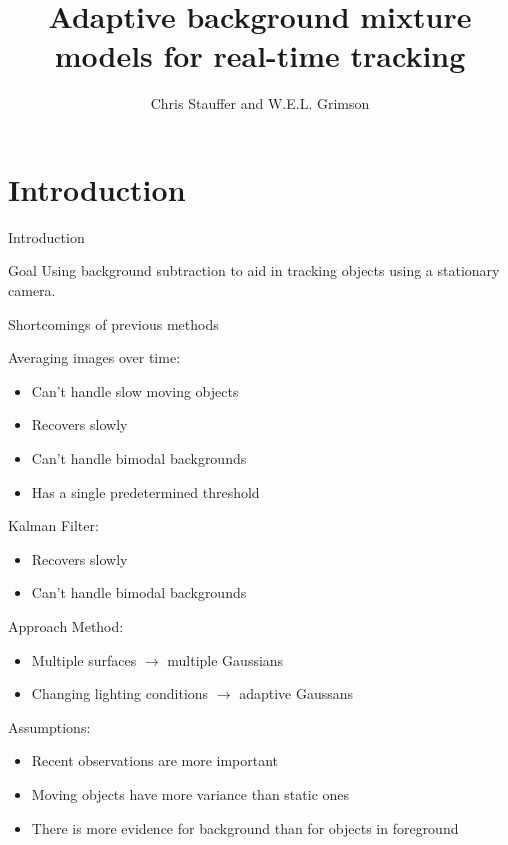 \documentclass{beamer}
\title[Adaptive background mixture models for real-time tracking]
{Adaptive background mixture models for real-time tracking}
\author[Chris Stauffer and W.E.L. Grimson] %
{Chris Stauffer and W.E.L. Grimson}
\institute[University of Amsterdam] %
{
  Chiel Kooijman and Auke Wiggers \\
  Computer Vision  \\
  Artificial Intelligence \\
  Faculty of Science (FNWI) \\
  University of Amsterdam
}
\begin{document}
\maketitle


\begin{comment}
\begin{frame}{Outline}
  \setcounter{tocdepth}{1}
  \tableofcontents
\end{frame}
\end{comment}

\section{Introduction}
\begin{frame}{Introduction}
\begin{block}{Goal}
Using background subtraction to aid in tracking objects using a stationary camera.
\end{block}

\end{frame}

\begin{frame}{Shortcomings of previous methods}

Averaging images over time:
\begin{itemize}
\item Can't handle slow moving objects
\item Recovers slowly
\item Can't handle bimodal backgrounds
\item Has a single predetermined threshold
\end{itemize}

Kalman Filter:
\begin{itemize}
\item Recovers slowly
\item Can't handle bimodal backgrounds
\end{itemize}
\end{frame}

\begin{frame}{Approach}
Method:
\begin{itemize}
\item Multiple surfaces $\rightarrow$ multiple Gaussians
\item Changing lighting conditions $\rightarrow$ adaptive Gaussans
\end{itemize}

Assumptions:
\begin{itemize}
\item Recent observations are more important
\item Moving objects have more variance than static ones
\item There is more evidence for background than for objects in foreground
\end{itemize}

\end{frame}
\end{document}
